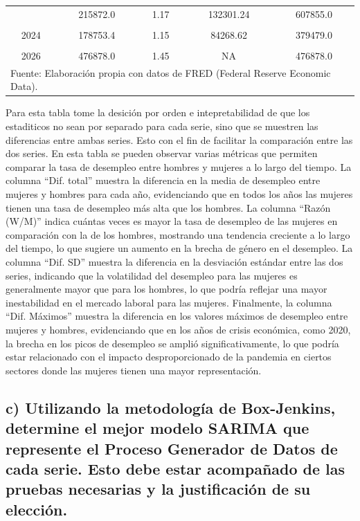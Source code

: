 \documentclass[
  11pt,
  letterpaper,
  DIV=11,
  numbers=noendperiod]{scrartcl}
\begin{document}
\begin{longtable}[t]{ccccc}
\addlinespace
2022 & 215872.0 & 1.17 & 132301.24 & 607855.0\\
\cellcolor{gray!10}{2023} & \cellcolor{gray!10}{194290.1} & \cellcolor{gray!10}{1.16} & \cellcolor{gray!10}{112228.33} & \cellcolor{gray!10}{488385.0}\\
2024 & 178753.4 & 1.15 & 84268.62 & 379479.0\\
\cellcolor{gray!10}{2025} & \cellcolor{gray!10}{230349.4} & \cellcolor{gray!10}{1.22} & \cellcolor{gray!10}{164436.87} & \cellcolor{gray!10}{634776.0}\\
2026 & 476878.0 & 1.45 & NA & 476878.0\\
\bottomrule
\multicolumn{5}{l}{\rule{0pt}{1em}Fuente: Elaboración propia con datos de FRED (Federal Reserve Economic Data).}\\
\end{longtable}
\endgroup{}

Para esta tabla tome la desición por orden e intepretabilidad de que los
estaditicos no sean por separado para cada serie, sino que se muestren
las diferencias entre ambas series. Esto con el fin de facilitar la
comparación entre las dos series. En esta tabla se pueden observar
varias métricas que permiten comparar la tasa de desempleo entre hombres
y mujeres a lo largo del tiempo. La columna ``Dif. total'' muestra la
diferencia en la media de desempleo entre mujeres y hombres para cada
año, evidenciando que en todos los años las mujeres tienen una tasa de
desempleo más alta que los hombres. La columna ``Razón (W/M)'' indica
cuántas veces es mayor la tasa de desempleo de las mujeres en
comparación con la de los hombres, mostrando una tendencia creciente a
lo largo del tiempo, lo que sugiere un aumento en la brecha de género en
el desempleo. La columna ``Dif. SD'' muestra la diferencia en la
desviación estándar entre las dos series, indicando que la volatilidad
del desempleo para las mujeres es generalmente mayor que para los
hombres, lo que podría reflejar una mayor inestabilidad en el mercado
laboral para las mujeres. Finalmente, la columna ``Dif. Máximos''
muestra la diferencia en los valores máximos de desempleo entre mujeres
y hombres, evidenciando que en los años de crisis económica, como 2020,
la brecha en los picos de desempleo se amplió significativamente, lo que
podría estar relacionado con el impacto desproporcionado de la pandemia
en ciertos sectores donde las mujeres tienen una mayor representación.

\subsection{c) Utilizando la metodología de Box-Jenkins, determine el
mejor modelo SARIMA que represente el Proceso Generador de Datos de cada
serie. Esto debe estar acompañado de las pruebas necesarias y la
justificación de su
elección.}\label{c-utilizando-la-metodologuxeda-de-box-jenkins-determine-el-mejor-modelo-sarima-que-represente-el-proceso-generador-de-datos-de-cada-serie.-esto-debe-estar-acompauxf1ado-de-las-pruebas-necesarias-y-la-justificaciuxf3n-de-su-elecciuxf3n.}
\end{document}
